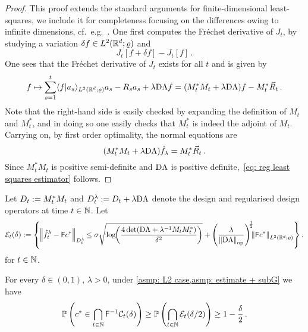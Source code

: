 \begin{proof}
    This proof extends the standard arguments for finite-dimensional least-squares, we include it for completeness focusing on the differences owing to infinite dimensions, cf.\ e.g.\ \citep[\S~3.2]{abbasi-yadkori_online_2012}. One first computes the Fréchet derivative of $J_t$, by studying a variation $\delta f\in L^2(\mathbb{R}^d;\varrho)$ and
    \[
    J_t[f+\delta f] - J_t[f]\,.
    \]
    One sees that the Fréchet derivative of $J_t$ exists for all $t$ and is given by 
    \[
        f\mapsto \sum_{s=1}^t\langle f\vert a_s\rangle_{L^2(\mathbb{R}^d;\varrho)}a_s- R_s a_s +\lambda\mathrm{D}\Lambda f= (M^*_t M_t+\lambda\mathrm{D}\Lambda)f -M^*_t\vec{R}_t\,.
    \]
    Note that the right-hand side is easily checked by expanding the definition of $M_t$ and $M^*_t$, and in doing so one easily checks that $M^*_t$ is indeed the adjoint of $M_t$. Carrying on, by first order optimality, the normal equations are 
    \[
        (M^*_t M_t+ \lambda\mathrm{D}\Lambda)\hat f_\lambda = M^*_t \vec{R}_t\,.
    \]
    Since $M^*_t M_t$ is positive semi-definite and $\mathrm{D}\Lambda$ is positive definite,~\eqref{eq: reg least squares estimator} follows. 
\end{proof}

Let $D_t:=M^*_t M_t$ and $D^\lambda_t:=D_t+\lambda\mathrm{D}\Lambda$ denote the design and regularised design operators at time $t\in\mathbb{N}$. Let
    \begin{align}
        \mathcal{E}_t(\delta):=\left\{\hspace{-1pt}\left\lVert\hat f_t^\lambda - \mathsf{F} c^*\right\rVert_{D^\lambda_t}\hspace{-1pt}\le \sigma\sqrt{\log\hspace{-3pt}\left(\frac{4\det(\mathrm{D}\Lambda+\lambda^{-1}M_t M^*_t)}{\delta^2}\right)} +{\left(\frac{\lambda}{\left\lVert\mathrm{D}\Lambda\right\rVert_{{\rm op}}}\right)}^{\hspace{-2pt}\frac12}\hspace{-5pt}\left\lVert\mathsf{F} c^*\right\rVert_{L^2(\mathbb{R}^d;\varrho)}\right\}.\label{eq: event def}
    \end{align}
for $t\in\mathbb{N}$.

\begin{lemma}\label{lemma: probability of confsets unif in N}
    For every $\delta\in(0,1)$, $\lambda>0$, under \cref{asmp: L2 case,asmp: estimate + subG} we have 
    \[  \mathbb{P}\left(c^*\in \bigcap_{t\in\mathbb{N}}\mathsf{F}^{-1}\mathcal{C}_t(\delta)\right)\ge\mathbb{P}\left(\bigcap_{t\in\mathbb{N}} \mathcal{E}_t(\delta/2)\right)\ge 1-\frac\delta2 \,.\]
\end{lemma}


